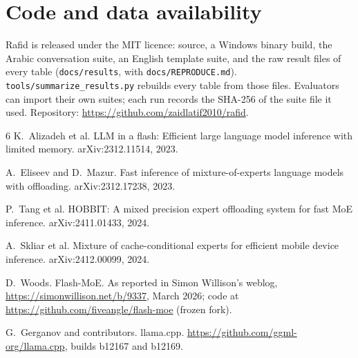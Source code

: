 \section*{Code and data availability}
Rafid is released under the MIT licence: source, a Windows binary build, the Arabic conversation suite, an English template suite, and the raw result files of every table (\texttt{docs/results}, with \texttt{docs/REPRODUCE.md}). \texttt{tools/summarize\_results.py} rebuilds every table from those files. Evaluators can import their own suites; each run records the SHA-256 of the suite file it used. Repository: \url{https://github.com/zaidlatif2010/rafid}.

\begin{thebibliography}{6}
K.~Alizadeh et al.
\newblock LLM in a flash: Efficient large language model inference with limited memory.
\newblock arXiv:2312.11514, 2023.

A.~Eliseev and D.~Mazur.
\newblock Fast inference of mixture-of-experts language models with offloading.
\newblock arXiv:2312.17238, 2023.

P.~Tang et al.
\newblock HOBBIT: A mixed precision expert offloading system for fast MoE inference.
\newblock arXiv:2411.01433, 2024.

A.~Skliar et al.
\newblock Mixture of cache-conditional experts for efficient mobile device inference.
\newblock arXiv:2412.00099, 2024.

D.~Woods.
\newblock Flash-MoE.
\newblock As reported in Simon Willison's weblog, \url{https://simonwillison.net/b/9337}, March 2026; code at \url{https://github.com/fiveangle/flash-moe} (frozen fork).

G.~Gerganov and contributors.
\newblock llama.cpp.
\newblock \url{https://github.com/ggml-org/llama.cpp}, builds b12167 and b12169.
\end{thebibliography}
